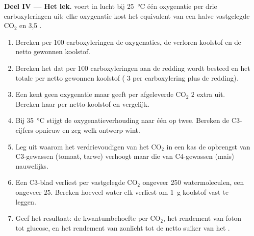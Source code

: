 \begin{problem}
\medskip
\noindent\textbf{Deel IV --- Het lek.}
 voert in lucht bij \qty{25}{\celsius} één oxygenatie per drie
carboxyleringen uit; elke oxygenatie kost het equivalent van een halve vastgelegde
$\mathrm{CO_2}$ en 3,5 .
\begin{enumerate}[resume]
  \item Bereken per 100 carboxyleringen de oxygenaties, de verloren
        koolstof en de netto gewonnen koolstof.
  \item Bereken het  dat per 100 carboxyleringen aan de redding wordt
        besteed en het totale  per netto gewonnen koolstof (
        3  per carboxylering plus de redding).
  \item Een  kent geen oxygenatie maar geeft per afgeleverde
        $\mathrm{CO_2}$ 2 extra  uit. Bereken haar  per netto
        koolstof en vergelijk.
  \item Bij \qty{35}{\celsius} stijgt de oxygenatieverhouding naar één op
        twee. Bereken de C3-cijfers opnieuw en zeg welk ontwerp wint.
  \item Leg uit waarom het verdrievoudigen van het $\mathrm{CO_2}$ in een
        kas de opbrengst van C3-gewassen (tomaat, tarwe) verhoogt maar die
        van C4-gewassen (mais) nauwelijks.
  \item Een C3-blad verliest per vastgelegde $\mathrm{CO_2}$ ongeveer 250
        watermoleculen, een  ongeveer 25. Bereken hoeveel water elk
        verliest om \qty{1}{g} koolstof vast te leggen.
  \item Geef het resultaat: de kwantumbehoefte per $\mathrm{CO_2}$, het
        rendement van foton tot glucose, en het rendement van zonlicht tot
        de netto suiker van het .
\end{enumerate}
\end{problem}
